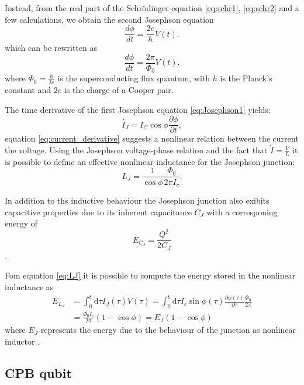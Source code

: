 Instead, from the real part of the Schr\"odinger equation \ref{eq:schr1}, \ref{eq:schr2} and a few calculations, we obtain the second Josephson equation
\begin{equation}\label{eq:Josephson2}
    \frac{d\phi}{dt} = \frac{2e}{\hbar} V(t).
\end{equation}
which can be rewritten as \begin{equation}
    \frac{d\phi}{dt} = \frac{2\pi}{\Phi_0} V(t).
\end{equation}
where $\Phi_0 = \frac{h}{2e}$ is the superconducting flux quantum, with $h$ is the Planck's constant and $2e$ is the charge of a Cooper pair.

The time derivative of the first Josephson equation \ref{eq:Josephson1} yields:
\begin{equation}\label{eq:current_derivative}
    \dot{I_J}=I_C\cos{\phi}\frac{\partial \phi}{\partial t},
\end{equation}
equation \ref{eq:current_derivative} suggests a nonlinear relation between the current the voltage. 
Using the Josephson voltage-phase relation and the fact that $\dot{I}=\frac{V}{L}$ it is possible to define an effective nonlinear inductance for the Josephson junction:
\begin{equation}\label{eq:LJ}
    L_J = \frac{1}{\cos{\phi}}\frac{\Phi_0}{2\pi I_c}.
\end{equation} 

In addition to ths inductive behaviour the Josephson junction also exibits capacitive properties due to its inherent capacitance $C_J$ with a corresponing energy of 
\begin{equation}\label{eq:capacitive_energy}
    E_{C_J} = \frac{Q^2}{2C_J}
\end{equation}.

Fom equation \ref{eq:LJ} it is possible to compute the energy stored in the nonlinear inductance as
\begin{align}\label{eq:inductive_energy}
    E_{L_J} &= \int_{0}^{t}\text{d}\tau I_J(\tau)V(\tau) = \int_{0}^{t}\text{d}\tau I_c\sin{\phi(\tau)}\frac{\partial\phi(\tau)}{\partial\tau}\frac{\Phi_0}{2\pi}\\
    &= \frac{\Phi_0 I_c}{2\pi}(1-\cos{\phi}) = E_J(1-\cos{\phi})
\end{align}
where $E_J$ represents the energy due to the behaviour of the junction as nonlinear inductor .

\subsection{CPB qubit}

